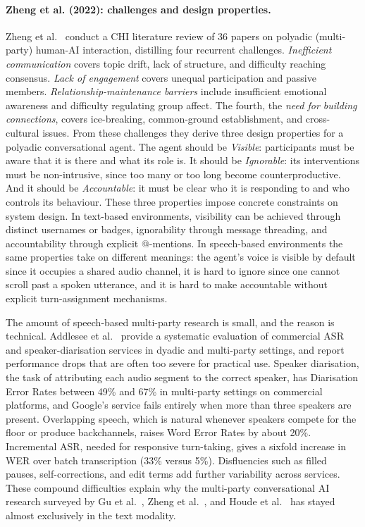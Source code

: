 \paragraph{Zheng et al. (2022): challenges and design properties.}
Zheng et al.~\cite{zheng2022polyadic} conduct a CHI literature review of 36 papers on polyadic (multi-party) human-AI interaction, distilling four recurrent challenges. \emph{Inefficient communication} covers topic drift, lack of structure, and difficulty reaching consensus. \emph{Lack of engagement} covers unequal participation and passive members. \emph{Relationship-maintenance barriers} include insufficient emotional awareness and difficulty regulating group affect. The fourth, the \emph{need for building connections}, covers ice-breaking, common-ground establishment, and cross-cultural issues. From these challenges they derive three design properties for a polyadic conversational agent. The agent should be \emph{Visible}: participants must be aware that it is there and what its role is. It should be \emph{Ignorable}: its interventions must be non-intrusive, since too many or too long become counterproductive. And it should be \emph{Accountable}: it must be clear who it is responding to and who controls its behaviour. These three properties impose concrete constraints on system design. In text-based environments, visibility can be achieved through distinct usernames or badges, ignorability through message threading, and accountability through explicit @-mentions. In speech-based environments the same properties take on different meanings: the agent's voice is visible by default since it occupies a shared audio channel, it is hard to ignore since one cannot scroll past a spoken utterance, and it is hard to make accountable without explicit turn-assignment mechanisms.

The amount of speech-based multi-party research is small, and the reason is technical. Addlesee et al.~\cite{addlesee2020asr} provide a systematic evaluation of commercial ASR and speaker-diarisation services in dyadic and multi-party settings, and report performance drops that are often too severe for practical use. Speaker diarisation, the task of attributing each audio segment to the correct speaker, has Diarisation Error Rates between 49\% and 67\% in multi-party settings on commercial platforms, and Google's service fails entirely when more than three speakers are present. Overlapping speech, which is natural whenever speakers compete for the floor or produce backchannels, raises Word Error Rates by about 20\%. Incremental ASR, needed for responsive turn-taking, gives a sixfold increase in WER over batch transcription (33\% versus 5\%). Disfluencies such as filled pauses, self-corrections, and edit terms add further variability across services. These compound difficulties explain why the multi-party conversational AI research surveyed by Gu et al.~\cite{gu2022mpc}, Zheng et al.~\cite{zheng2022polyadic}, and Houde et al.~\cite{houde2025koala} has stayed almost exclusively in the text modality.

